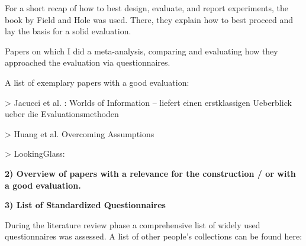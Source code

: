 	For a short recap of how to best design, evaluate, and report experiments, the book by Field and Hole \cite{field2003design} was used. There, they explain how to best proceed and lay the basis for a solid evaluation. 




	Papers on which I did a meta-analysis, comparing and evaluating how they approached the evaluation via questionnaires.

	A list of exemplary papers with a good evaluation:

	> Jacucci et al. \cite{jacucci2010worldsofinformation}: Worlds of Information -- liefert einen erstklassigen Ueberblick ueber die Evaluationsmethoden

	> Huang et al. \cite{huang2008overcoming} Overcoming Assumptions

	> LookingGlass: \cite{Muller2012LookingGlass}





	\textbf{2) Overview of papers with a relevance for the construction / or with a good evaluation.}




	\textbf{3) List of Standardized Questionnaires}

		During the literature review phase a comprehensive list of widely used questionnaires was assessed. A list of other people's collections can be found here:

